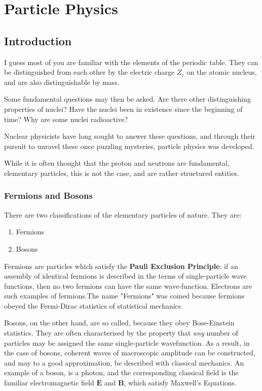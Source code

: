 \section{Particle Physics}
\subsection{Introduction}
I guess most of you are familiar with the elements of the periodic table. They can be distinguished from each other by the electric charge $Z_e$ on the atomic nucleus, and are also distinguishable by mass.

Some fundamental questions may then be asked. Are there other distinguishing properties of nuclei? Have the nuclei been in existence since the beginning of time? Why are some nuclei radioactive?

Nuclear physicists have long sought to answer these questions, and through their pursuit to unravel these once puzzling mysteries, particle physics was developed.

While it is often thought that the proton and neutrons are fundamental, elementary particles, this is not the case, and are rather structured entities. 

\subsubsection{Fermions and Bosons}
There are two classifications of the elementary particles of nature. They are:
\begin{enumerate}
\item Fermions
\item Bosons
\end{enumerate}

Fermions are particles which satisfy the \textbf{Pauli Exclusion Principle}: if an assembly of identical fermions is described in the terms of single-particle wave functions, then no two fermions can have the same wave-function. Electrons are such examples of fermions.The name "Fermions" was coined because fermions obeyed the Fermi-Dirac statistics of statistical mechanics.

Bosons, on the other hand, are so called, because they obey Bose-Einstein statistics. They are often characterised by the property that \emph{any} number of particles may be assigned the same single-particle wavefunction. As a result, in the case of bosons, coherent waves of macroscopic amplitude can be constructed, and may to a good approximation, be described with classical mechanics. An example of a boson, is a photon, and the corresponding classical field is the familiar electromagnetic field $\mathbf{E}$ and $\mathbf {B}$, which satisfy Maxwell's Equations.

